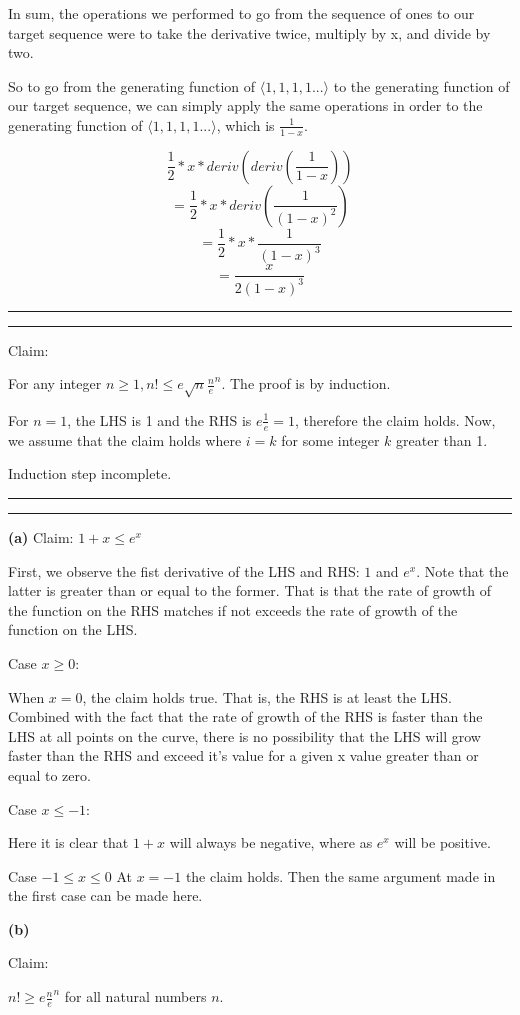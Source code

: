 \documentclass[11pt,letterpaper]{article}
\newcommand{\question}[2] {\vspace{.25in} \hrule\vspace{0.5em}
\noindent{\bf #1: #2} \vspace{0.5em}
\hrule \vspace{.10in}}
\begin{document}
In sum, the operations we performed to go from the sequence of ones to our target sequence
were to take the derivative twice, multiply by x, and divide by two.

So to go from the generating function of $\langle 1, 1, 1, 1 ... \rangle$ to the generating function of our target sequence,
we can simply apply the same operations in order to the generating function of $\langle 1, 1, 1, 1 ... \rangle$, which is $\frac{1}{1-x}$.

$$\frac{1}{2} * x * deriv( deriv( \frac{1}{1-x} ) ) $$
$$=\frac{1}{2} * x * deriv( \frac{1}{(1-x)^2} ) $$
$$=\frac{1}{2} * x * \frac{1}{(1-x)^3} $$
$$=\frac{x}{2(1-x)^3} $$


\question{3}{3}
Claim:

For any integer $n \geq 1, n! \leq e \sqrt{n} \frac{n}{e}^n$. The proof is by induction.

For $ n = 1 $, the LHS is 1 and the RHS is $e \frac{1}{e} = 1$, therefore the claim holds.
Now, we assume that the claim holds where $i=k$ for some integer $k$ greater than 1.

Induction step incomplete.



\question{4}{4}

\textbf{(a)}
Claim:
$1 + x \leq e^x$

First, we observe the fist derivative of the LHS and RHS: $1$ and $e^x$. Note that the latter is greater than or equal to the former.
That is that the rate of growth of the function on the RHS matches if not exceeds the rate of growth of the function on the LHS.

Case $x \geq 0$:

When $x=0$, the claim holds true. That is, the RHS is at least the LHS. Combined with the fact that
the rate of growth of the RHS is faster than the LHS at all points on the curve, there is no possibility
that the LHS will grow faster than the RHS and exceed it's value for a given x value greater than or equal to zero.

Case $x \leq -1$:

Here it is clear that $1+x$ will always be negative, where as $e^x$ will be positive.

Case $-1 \leq x \leq 0$
At $x=-1$ the claim holds. Then the same argument made in the first case can be made here.

\textbf{(b)}

Claim:

$n! \geq e \frac{n}{e}^n $ for all natural numbers $n$.
\end{document}
